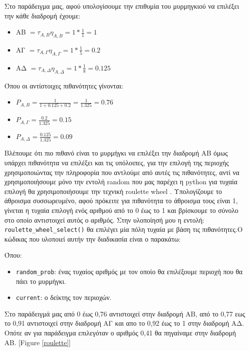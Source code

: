 Στο παράδειγμα μας, αφού υπολογίσουμε την επιθυμία του μυρμηγκιού να επιλέξει την κάθε διαδρομή έχουμε:

\begin{itemize}
    \item AΒ $= τ_{A,B}η_{A,B}=1*\frac{1}{1}=1$ 
    \item AΓ $= τ_{A,Γ}η_{A,Γ}=1*\frac{1}{5}=0.2$
    \item AΔ $= τ_{A,Δ}η_{A,Δ}=1*\frac{1}{8}=0.125$
\end{itemize}

Όπου οι αντίστοιχες πιθανότητες γίνονται:

\begin{itemize}
    \item $P_{A,B}=\frac{1}{1+0.125+0.2}=\frac{1}{1.325}=0.76$
    \item $P_{A,Γ}=\frac{0.2}{1.325}=0.15$
    \item $P_{A,Δ}=\frac{0.125}{1.325}=0.09$
\end{itemize}

Βλέπουμε ότι πιο πιθανό είναι το μυρμήγκι να επιλέξει την διαδρομή ΑΒ όμως υπάρχει πιθανότητα να επιλέξει και τις υπόλοιπες, για την επιλογή της περιοχής χρησιμοποιώντας την πληροφορία που αντλούμε από αυτές τις πιθανότητες, αντί να χρησιμοποιήσουμε μόνο την εντολή random που μας παρέχει η python για τυχαία επιλογή θα χρησιμοποιήσουμε την τεχνική roulette wheel \cite{Adam-Dorota}. Υπολογίζουμε το άθροισμα συσσωρευμένο, αφού πρόκειτε για πιθανότητα το άθροισμα τους είναι 1, γίνεται η τυχαία επιλογή ενός αριθμού από το 0 έως το 1 και βρίσκουμε το σύνολο στο οποίο αντιστοιχεί αυτός ο αριθμός.
Στην υλοποίησή μου η εντολή: \verb|roulette_wheel_select()| θα επιλέγει μία πόλη τυχαία με βάση τις πιθανότητες.Ο κώδικας που υλοποιεί αυτήν την διαδικασία είναι ο παρακάτω: 

Όπου:
\begin{itemize}
    \item \verb|random_prob|: ένας τυχαίος αριθμός με τον οποίο θα επιλέξουμε περιοχή που θα πάει το μυρμήγκι.
    \item \verb|current|: ο δείκτης τον περιοχών.
\end{itemize}

 Στο παράδειγμά μας από 0 έως 0,76 αντιστοιχεί στην διαδρομή ΑΒ, από το 0,77 εως το 0,91 αντιστοιχεί στην διαδρομή ΑΓ και απο το 0,92 έως το 1 στην διαδρομή ΑΔ. Οπότε αν για παράδειγμα επιλεγόταν ο αριθμός 0,41 θα πηγαίναμε στην διαδρομή ΑΒ. [Figure \ref{roulette}]
 
